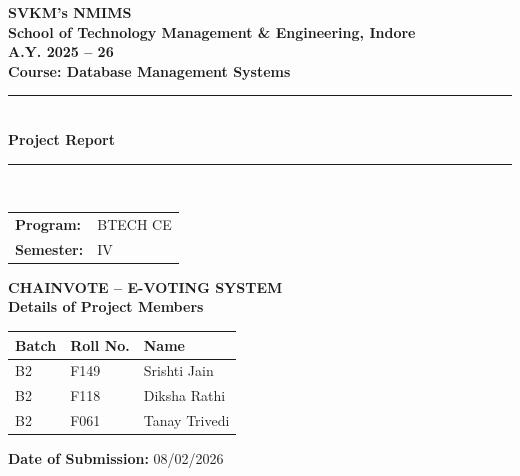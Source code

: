 \documentclass[12pt, a4paper]{article}
\begin{document}
\begin{titlepage}
    \centering
    \vspace*{1cm}
    
    {\Large \textbf{SVKM's NMIMS}} \\[0.4cm]
    {\Large \textbf{School of Technology Management \& Engineering, Indore}} \\[0.4cm]
    {\large \textbf{A.Y. 2025 -- 26}} \\[0.8cm]
    {\large \textbf{Course: Database Management Systems}} \\[1cm]
    
    \rule{\linewidth}{0.5pt} \\[0.5cm]
    {\Huge \textbf{Project Report}} \\[0.3cm]
    \rule{\linewidth}{0.5pt} \\[1cm]

    \begin{tabular}{@{} l l @{}}
        \textbf{Program:} & BTECH CE \\[4pt]
        \textbf{Semester:} & IV \\
    \end{tabular}

    \vspace{1cm}
    {\LARGE \textbf{CHAINVOTE -- E-VOTING SYSTEM}} \\[1.2cm]

    {\large \textbf{Details of Project Members}} \\[0.5cm]
    \begin{tabular}{|>{\centering\arraybackslash}p{2cm}|>{\centering\arraybackslash}p{2cm}|>{\centering\arraybackslash}p{6cm}|}
        \hline
        \textbf{Batch} & \textbf{Roll No.} & \textbf{Name} \\
        \hline
        B2 & F149 & Srishti Jain \\
        \hline
        B2 & F118 & Diksha Rathi \\
        \hline
        B2 & F061 & Tanay Trivedi \\
        \hline
    \end{tabular}

    \vspace{1cm}
    {\normalsize \textbf{Date of Submission:} 08/02/2026} \\[1cm]


\end{titlepage}
\end{document}
